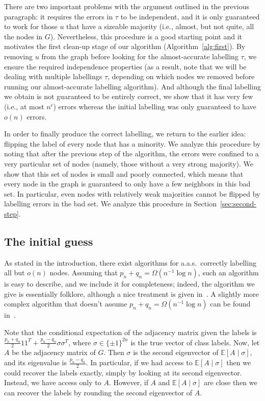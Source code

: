\documentclass[EJP,final]{ejpecp}
\newcommand{\E}{\mathbb{E}}
\newcommand{\1}[1]{\mathbbm{1}_{\{#1\}}}
\begin{document}
There are two important problems with the argument outlined in the
previous paragraph: it requires the errors in $\tau$
to be independent, and it is only guaranteed to work
for those $u$ that have a sizeable majority (i.e., almost, but not quite,
all the nodes in $G$). Nevertheless, this procedure is a good starting
point and it motivates the first clean-up stage of our
algorithm (Algorithm~\ref{alg:first}). By removing
$u$ from the graph before looking for the almost-accurate labelling $\tau$,
we ensure the required independence properties
(as a result, note that we will be dealing with multiple labellings $\tau$,
depending on which nodes we removed before running our almost-accurate labelling
algorithm). And although the final
labelling we obtain is not guaranteed to be entirely correct, we show
that it has very few (i.e., at most $n^\epsilon$) errors whereas
the initial labelling was only guaranteed to have $o(n)$ errors.

In order to finally produce the correct labelling, we
return to the earlier idea: flipping the label of every node
that has a minority. We analyze this procedure by noting that
after the previous step of the algorithm, the errors were confined to
a very particular set of nodes (namely, those without a very strong majority).
We show that this set of nodes is small and poorly connected, which
means that every node in the graph is guaranteed to only have a few neighbors
in this bad set. In particular, even nodes with relatively weak majorities
cannot be flipped by labelling errors in the bad set.
We analyze this procedure in Section~\ref{sec:second-step}.


\subsection{The initial guess}\label{sec:spectral}

As stated in the introduction,
there exist algorithms for a.a.s.\ correctly labelling all but
$o(n)$ nodes. Assuming that $p_n + q_n = \Omega(n^{-1} \log n)$, such
an algorithm is easy to describe, and we include it for completeness;
indeed, the algorithm we give is essentially
folklore, although a nice treatment is given in~\cite{NadakuditiNewman:12}.
A slightly more complex algorithm that doesn't assume
$p_n + q_n = \Omega(n^{-1} \log n)$ can be found in~\cite{YunProutiere:14}.

Note that the conditional expectation
of the adjacency matrix given the labels is $\frac{p_n + q_n}{2} 1 1^T + \frac{p_n - q_n}{2} \sigma \sigma^T$,
where $\sigma \in \{\pm 1\}^{2n}$ is the true vector of class labels.
Now, let $A$ be the adjacency matrix of $G$. Then $\sigma$ is the second eigenvector of $\E [A \mid \sigma]$,
and its eigenvalue is $\frac{p_n - q_n}{2}$. In particular, if we had access to $\E [A \mid \sigma]$ then
we could recover the labels exactly, simply by looking at its second eigenvector.
Instead, we have access only to $A$. However, if $A$ and $\E[A \mid \sigma]$ are close then
we can recover the labels by rounding the second eigenvector of $A$.
\end{document}
